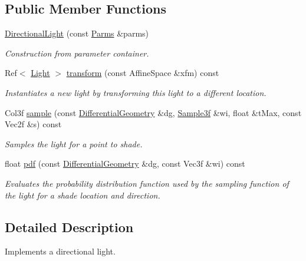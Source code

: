 \subsection*{Public Member Functions}
\begin{DoxyCompactItemize}
\item 
\hyperlink{classembree_1_1_directional_light_a09b63657f26ce7adaeeb787a2e95d4d6}{DirectionalLight} (const \hyperlink{classembree_1_1_parms}{Parms} \&parms)
\begin{DoxyCompactList}\small\item\em Construction from parameter container. \item\end{DoxyCompactList}\item 
Ref$<$ \hyperlink{classembree_1_1_light}{Light} $>$ \hyperlink{classembree_1_1_directional_light_aea27ef2ba60eb7f2d8945a9e0f6c48c7}{transform} (const AffineSpace \&xfm) const 
\begin{DoxyCompactList}\small\item\em Instantiates a new light by transforming this light to a different location. \item\end{DoxyCompactList}\item 
Col3f \hyperlink{classembree_1_1_directional_light_a6af3bc942cd0f35726d7abe39cc96393}{sample} (const \hyperlink{structembree_1_1_differential_geometry}{DifferentialGeometry} \&dg, \hyperlink{structembree_1_1_sample}{Sample3f} \&wi, float \&tMax, const Vec2f \&s) const 
\begin{DoxyCompactList}\small\item\em Samples the light for a point to shade. \item\end{DoxyCompactList}\item 
float \hyperlink{classembree_1_1_directional_light_a4b1fbe653eb467dad05bf0d280b09def}{pdf} (const \hyperlink{structembree_1_1_differential_geometry}{DifferentialGeometry} \&dg, const Vec3f \&wi) const 
\begin{DoxyCompactList}\small\item\em Evaluates the probability distribution function used by the sampling function of the light for a shade location and direction. \item\end{DoxyCompactList}\end{DoxyCompactItemize}


\subsection{Detailed Description}
Implements a directional light. 

